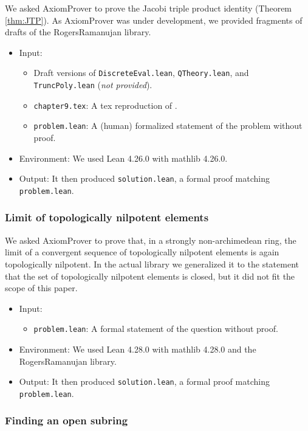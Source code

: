\documentclass[12pt]{amsart}
\theoremstyle{definition}
\theoremstyle{remark}
\numberwithin{equation}{subsection}
\begin{document}
We asked AxiomProver to prove the Jacobi triple product identity (Theorem \ref{thm:JTP}). As AxiomProver was under development, we provided fragments of drafts of the RogersRamanujan library.

\begin{itemize}
\item Input:
\begin{itemize}
\item Draft versions of \texttt{DiscreteEval.lean}, \texttt{QTheory.lean}, and \texttt{TruncPoly.lean} (\textit{not provided}).
\item \texttt{chapter9.tex}: A tex reproduction of \cite[Chapter 9]{Chan2009}.
\item \texttt{problem.lean}: A (human) formalized statement of the problem without proof.
\end{itemize}
\item Environment: We used Lean 4.26.0 with mathlib 4.26.0.
\item Output: It then produced \texttt{solution.lean}, a formal proof matching \texttt{problem.lean}.
\end{itemize}

\subsubsection{Limit of topologically nilpotent elements}

We asked AxiomProver to prove that, in a strongly non-archimedean ring, the limit of a convergent sequence of topologically nilpotent elements is again topologically nilpotent. In the actual library we generalized it to the statement that the set of topologically nilpotent elements is closed, but it did not fit the scope of this paper.

\begin{itemize}
\item Input:
\begin{itemize}
\item \texttt{problem.lean}: A formal statement of the question without proof.
\end{itemize}
\item Environment: We used Lean 4.28.0 with mathlib 4.28.0 and the RogersRamanujan library.
\item Output: It then produced \texttt{solution.lean}, a formal proof matching \texttt{problem.lean}.
\end{itemize}

\subsubsection{Finding an open subring}
\end{document}
